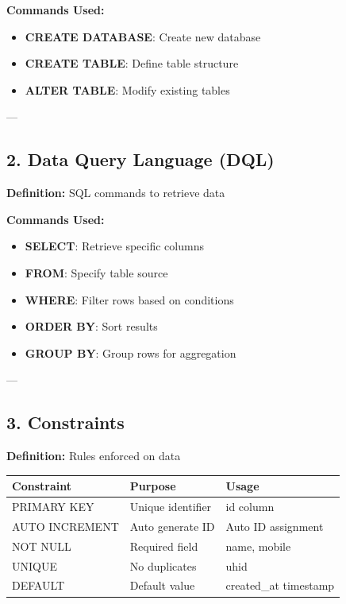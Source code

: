 \documentclass[12pt,a4paper]{article}
\begin{document}
\textbf{Commands Used:}
\begin{itemize}
    \item \textbf{CREATE DATABASE}: Create new database
    \item \textbf{CREATE TABLE}: Define table structure
    \item \textbf{ALTER TABLE}: Modify existing tables
\end{itemize}

---

\subsection{2. Data Query Language (DQL)}

\textbf{Definition:} SQL commands to retrieve data

\textbf{Commands Used:}
\begin{itemize}
    \item \textbf{SELECT}: Retrieve specific columns
    \item \textbf{FROM}: Specify table source
    \item \textbf{WHERE}: Filter rows based on conditions
    \item \textbf{ORDER BY}: Sort results
    \item \textbf{GROUP BY}: Group rows for aggregation
\end{itemize}

---

\subsection{3. Constraints}

\textbf{Definition:} Rules enforced on data

\begin{table}[h]
\centering
\begin{tabular}{|l|l|l|}
\hline
\textbf{Constraint} & \textbf{Purpose} & \textbf{Usage} \\
\hline
PRIMARY KEY & Unique identifier & id column \\
AUTO INCREMENT & Auto generate ID & Auto ID assignment \\
NOT NULL & Required field & name, mobile \\
UNIQUE & No duplicates & uhid \\
DEFAULT & Default value & created\_at timestamp \\
\hline
\end{tabular}
\end{table}
\end{document}
